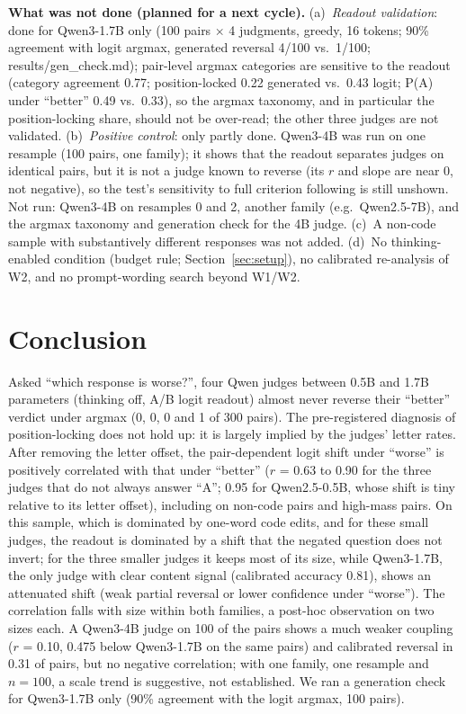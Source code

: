 \documentclass[conference]{IEEEtran}
\begin{document}
\textbf{What was not done (planned for a next cycle).} (a)~\emph{Readout validation}: done for Qwen3-1.7B only (100 pairs $\times$ 4 judgments, greedy, 16 tokens; 90\% agreement with logit argmax, generated reversal 4/100 vs.\ 1/100; results/gen\_check.md); pair-level argmax categories are sensitive to the readout (category agreement 0.77; position-locked 0.22 generated vs.\ 0.43 logit; P(A) under ``better'' 0.49 vs.\ 0.33), so the argmax taxonomy, and in particular the position-locking share, should not be over-read; the other three judges are not validated. (b)~\emph{Positive control}: only partly done. Qwen3-4B was run on one resample (100 pairs, one family);
it shows that the readout separates judges on identical pairs, but it is not a judge known to reverse (its $r$
and slope are near 0, not negative), so the test's sensitivity to full criterion following is still unshown.
Not run: Qwen3-4B on resamples 0 and 2, another family (e.g.\ Qwen2.5-7B), and the argmax taxonomy and
generation check for the 4B judge.
(c)~A non-code sample with substantively different responses was not added. (d)~No thinking-enabled condition (budget rule; Section~\ref{sec:setup}), no calibrated re-analysis of W2, and
no prompt-wording search beyond W1/W2.

\section{Conclusion}
Asked ``which response is worse?'', four Qwen judges between 0.5B and 1.7B parameters (thinking off,
A/B logit readout) almost never reverse their ``better'' verdict under argmax (0, 0, 0 and 1 of 300 pairs).
The pre-registered diagnosis of position-locking does not hold up: it is largely implied by the judges' letter
rates. After removing the letter offset, the pair-dependent logit shift under ``worse'' is positively
correlated with that under ``better'' ($r$ = 0.63 to 0.90 for the three judges that do not always answer ``A'';
0.95 for Qwen2.5-0.5B, whose shift is tiny relative to its letter offset), including on non-code pairs and
high-mass pairs. On this sample, which is dominated by one-word code edits, and for these small judges, the
readout is dominated by a shift that the negated question does not invert; for the three smaller judges it keeps
most of its size, while Qwen3-1.7B, the only judge with clear content signal (calibrated accuracy 0.81), shows an
attenuated shift (weak partial reversal or lower confidence under ``worse''). The correlation falls with size within both families, a post-hoc observation on two sizes
each. A Qwen3-4B judge on 100 of the pairs shows a much weaker coupling ($r$ = 0.10, 0.475 below Qwen3-1.7B on
the same pairs) and calibrated reversal in 0.31 of pairs, but no negative correlation; with one family, one
resample and $n=100$, a scale trend is suggestive, not established. We ran a generation check for Qwen3-1.7B only
(90\% agreement with the logit argmax, 100 pairs).
\end{document}
